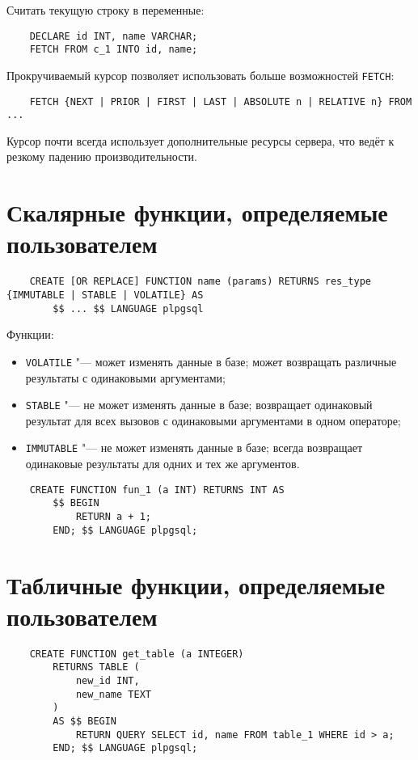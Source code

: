 Считать текущую строку в переменные:
\begin{verbatim}
	DECLARE id INT, name VARCHAR;
	FETCH FROM c_1 INTO id, name;
\end{verbatim}

Прокручиваемый курсор позволяет использовать больше возможностей \texttt{FETCH}:
\begin{verbatim}
	FETCH {NEXT | PRIOR | FIRST | LAST | ABSOLUTE n | RELATIVE n} FROM ...
\end{verbatim}

\begin{remark}
	Курсор почти всегда использует дополнительные ресурсы сервера, что ведёт к резкому падению производительности.
\end{remark}

\section{Скалярные функции, определяемые пользователем}

\begin{verbatim}
	CREATE [OR REPLACE] FUNCTION name (params) RETURNS res_type {IMMUTABLE | STABLE | VOLATILE} AS
		$$ ... $$ LANGUAGE plpgsql
\end{verbatim}

Функции:
\begin{itemize}
	\item \texttt{VOLATILE} "--- может изменять данные в базе; может возвращать различные результаты с одинаковыми аргументами;
	\item \texttt{STABLE} "--- не может изменять данные в базе; возвращает одинаковый результат для всех вызовов с одинаковыми аргументами в одном операторе;
	\item \texttt{IMMUTABLE} "--- не может изменять данные в базе; всегда возвращает одинаковые результаты для одних и тех же аргументов.
\end{itemize}

\begin{verbatim}
	CREATE FUNCTION fun_1 (a INT) RETURNS INT AS
		$$ BEGIN
			RETURN a + 1;
		END; $$ LANGUAGE plpgsql;
\end{verbatim}

\section{Табличные функции, определяемые пользователем}

\begin{verbatim}
	CREATE FUNCTION get_table (a INTEGER)
		RETURNS TABLE (
			new_id INT,
			new_name TEXT
		)
		AS $$ BEGIN
			RETURN QUERY SELECT id, name FROM table_1 WHERE id > a;
		END; $$ LANGUAGE plpgsql;
\end{verbatim}

